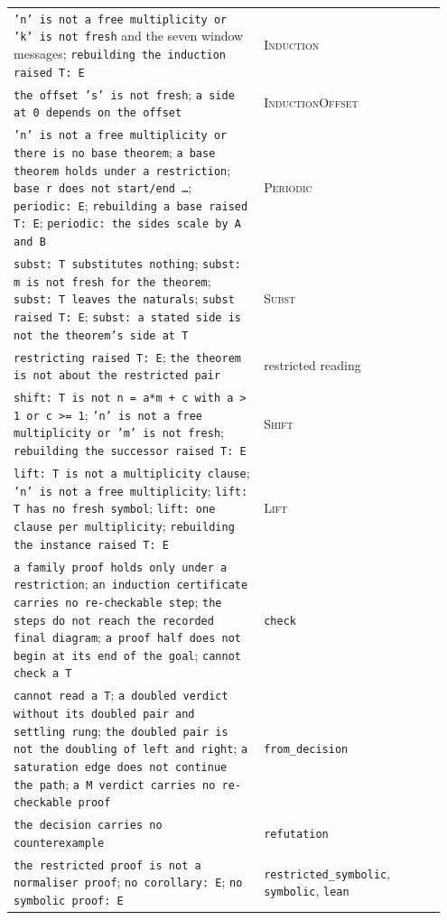 \begin{small}
\begin{longtable}{@{}>{\raggedright\arraybackslash}p{0.55\linewidth}>{\raggedright\arraybackslash}p{0.4\linewidth}@{}}
\texttt{'n' is not a free multiplicity or 'k' is not fresh} and the seven window messages; \texttt{rebuilding the induction raised T: E} & \textsc{Induction} \\
\texttt{the offset 's' is not fresh}; \texttt{a side at 0 depends on the offset} & \textsc{InductionOffset} \\
\texttt{'n' is not a free multiplicity or there is no base theorem}; \texttt{a base theorem holds under a restriction}; \texttt{base r does not start/end \ldots}; \texttt{periodic: E}; \texttt{rebuilding a base raised T: E}; \texttt{periodic: the sides scale by A and B} & \textsc{Periodic} \\
\texttt{subst: T substitutes nothing}; \texttt{subst: m is not fresh for the theorem}; \texttt{subst: T leaves the naturals}; \texttt{subst raised T: E}; \texttt{subst: a stated side is not the theorem's side at T} & \textsc{Subst} \\
\texttt{restricting raised T: E}; \texttt{the theorem is not about the restricted pair} & restricted reading \\
\texttt{shift: T is not n = a*m + c with a > 1 or c >= 1}; \texttt{'n' is not a free multiplicity or 'm' is not fresh}; \texttt{rebuilding the successor raised T: E} & \textsc{Shift} \\
\texttt{lift: T is not a multiplicity clause}; \texttt{'n' is not a free multiplicity}; \texttt{lift: T has no fresh symbol}; \texttt{lift: one clause per multiplicity}; \texttt{rebuilding the instance raised T: E} & \textsc{Lift} \\
\texttt{a family proof holds only under a restriction}; \texttt{an induction certificate carries no re-checkable step}; \texttt{the steps do not reach the recorded final diagram}; \texttt{a proof half does not begin at its end of the goal}; \texttt{cannot check a T} & \texttt{check} \\
\texttt{cannot read a T}; \texttt{a doubled verdict without its doubled pair and settling rung}; \texttt{the doubled pair is not the doubling of left and right}; \texttt{a saturation edge does not continue the path}; \texttt{a M verdict carries no re-checkable proof} & \texttt{from\_decision} \\
\texttt{the decision carries no counterexample} & \texttt{refutation} \\
\texttt{the restricted proof is not a normaliser proof}; \texttt{no corollary: E}; \texttt{no symbolic proof: E} & \texttt{restricted\_symbolic}, \texttt{symbolic}, \texttt{lean} \\

\end{longtable}
\end{small}
